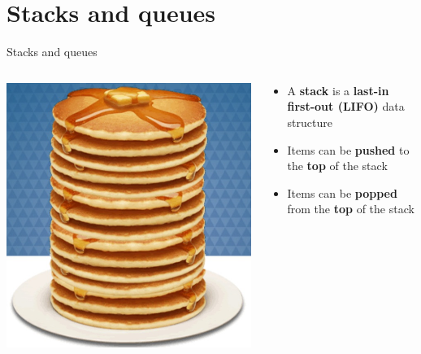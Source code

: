 \part{Stacks and queues}
\frame{\partpage}

\begin{frame}{Stacks and queues}
	\begin{columns}
		\pause
		\begin{column}{0.3\textwidth}
			\includegraphics[width=\textwidth]{stack}
		\end{column}
		\begin{column}{0.68\textwidth}
			\begin{itemize}
				\item A \textbf{stack} is a \textbf{last-in first-out (LIFO)} data structure
				\pause\item Items can be \textbf{pushed} to the \textbf{top} of the stack
				\pause\item Items can be \textbf{popped} from the \textbf{top} of the stack
			\end{itemize}
		\end{column}
	\end{columns}
	\begin{columns}
		\pause
		\begin{column}{0.3\textwidth}

\end{column}
\end{columns}
\end{frame}
